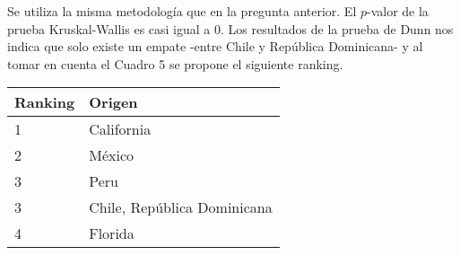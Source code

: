 \documentclass{article}
\begin{document}
Se utiliza la misma metodología que en la pregunta anterior. El $p$-valor de la prueba Kruskal-Wallis es casi igual a 0. Los resultados de la prueba de Dunn nos indica que solo existe un empate -entre Chile y República Dominicana- y al tomar en cuenta el Cuadro 5 se propone el siguiente ranking.

\begin{center}
	\begin{tabular}{|l|l|}
	\hline
		Ranking & Origen\\ \hline
		1 & California\\ \hline
		2 & México\\ \hline
		3 & Peru \\ \hline
		3 & Chile, República Dominicana\\ \hline
		4 & Florida \\ \hline
	\end{tabular}
\end{center}	
\end{document}
